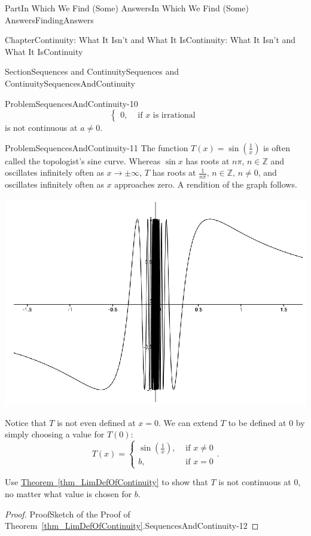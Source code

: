 \documentclass[oneside,10pt,]{book}
\newcommand{\xreffont}{\relax}
\numberwithin{equation}{part}
\newcommand{\ZZ}{\mathbb {Z}}
\newcommand{\amp}{&}
\begin{document}
\begin{partptx}{Part}{In Which We Find (Some) Answers}{}{In Which We Find (Some) Answers}{}{}{FindingAnswers}
\begin{chapterptx}{Chapter}{Continuity: What It Isn't and What It Is}{}{Continuity: What It Isn't and What It Is}{}{}{Continuity}
\begin{sectionptx}{Section}{Sequences and Continuity}{}{Sequences and Continuity}{}{}{SequencesAndContinuity}
\begin{problem}{Problem}{}{SequencesAndContinuity-10}
\begin{equation*}
\begin{cases}
0, \amp \text{ if } x\text{ is irrational } \end{cases}  
\end{equation*}
is not continuous at \(a\neq 0\).%
\end{problem}
\begin{problem}{Problem}{}{SequencesAndContinuity-11}%
The function \(T(x)=\sin\left(\frac{1}{x}\right)\) is often called the topologist's sine curve.  Whereas \(\sin
x\) has roots at \(n\pi\), \(n\in\ZZ\) and oscillates infinitely often as \(x\rightarrow\pm\infty\), \(T\) has roots at \(\frac{1}{n\pi},\,n\in\ZZ,\,n\neq
0\), and oscillates infinitely often as \(x\) approaches zero.  A rendition of the graph follows.%
\begin{image}{0.125}{0.75}{0.125}{}%
\includegraphics[width=\linewidth]{external/images/Ch5fig7.png}
\end{image}%
Notice that \(T\) is not even defined at \(x=0\). We can extend \(T\) to be defined at 0 by simply choosing a value for \(T(0):\)%
\begin{equation*}
T(x)= \begin{cases}
\sin\left(\frac{1}{x}\right),\amp \text{ if } x\neq 0\\ 
b,\amp \text{ if } x=0 \end{cases} \text{.}
\end{equation*}
%
\par
Use \hyperref[thm_LimDefOfContinuity]{Theorem~{\xreffont\ref{thm_LimDefOfContinuity}}} to show that \(T\) is not continuous at \(0\), no matter what value is chosen for \(b\).%
\end{problem}
\begin{proof}{Proof}{Sketch of the Proof of Theorem~{\xreffont\ref*{thm_LimDefOfContinuity}}.}{SequencesAndContinuity-12}

\end{proof}
\end{sectionptx}
\end{chapterptx}
\end{partptx}
\end{document}
